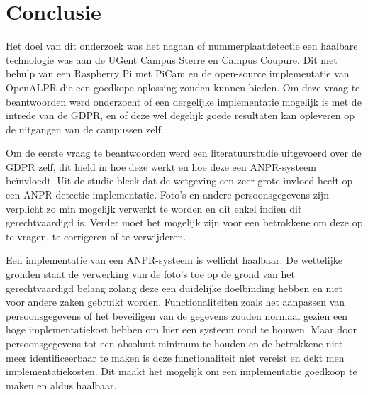 
\chapter{Conclusie}
\label{ch:conclusie}


Het doel van dit onderzoek was het nagaan of nummerplaatdetectie een haalbare technologie was aan de UGent Campus Sterre en Campus Coupure. Dit met behulp van een Raspberry Pi met PiCam en de open-source implementatie van OpenALPR die een goedkope oplossing zouden kunnen bieden. Om deze vraag te beantwoorden werd onderzocht of een dergelijke implementatie mogelijk is met de intrede van de GDPR, en of deze wel degelijk goede resultaten kan opleveren op de uitgangen van de campussen zelf.

Om de eerste vraag te beantwoorden werd een literatuurstudie uitgevoerd over de GDPR zelf, dit hield in hoe deze werkt en hoe deze een ANPR-systeem beïnvloedt. Uit de studie bleek dat de wetgeving een zeer grote invloed heeft op een ANPR-detectie implementatie. Foto's en andere persoonsgegevens zijn verplicht zo min mogelijk verwerkt te worden en dit enkel indien dit gerechtvaardigd is. Verder moet het mogelijk zijn voor een betrokkene om deze op te vragen, te corrigeren of te verwijderen.

Een implementatie van een ANPR-systeem is wellicht haalbaar. De wettelijke gronden staat de verwerking van de foto's toe op de grond van het gerechtvaardigd belang zolang deze een duidelijke doelbinding hebben en niet voor andere zaken gebruikt worden. Functionaliteiten zoals het aanpassen van persoonsgegevens of het beveiligen van de gegevens zouden normaal gezien een hoge implementatiekost hebben om hier een systeem rond te bouwen. Maar door persoonsgegevens tot een absoluut minimum te houden en de betrokkene niet meer identificeerbaar te maken is deze functionaliteit niet vereist en dekt men implementatiekosten. Dit maakt het mogelijk om een implementatie goedkoop te maken en aldus haalbaar.

